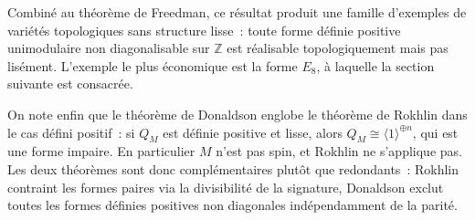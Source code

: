 Combiné au théorème de Freedman, ce résultat produit une famille d'exemples de variétés
topologiques sans structure lisse~: toute forme définie positive unimodulaire non
diagonalisable sur $\mathbb{Z}$ est réalisable topologiquement mais pas lisément. L'exemple
le plus économique est la forme $E_8$, à laquelle la section suivante est consacrée.

\medskip

On note enfin que le théorème de Donaldson englobe le théorème de Rokhlin dans le cas défini
positif~: si $Q_M$ est définie positive et lisse, alors $Q_M \cong \langle 1 \rangle^{\oplus
n}$, qui est une forme impaire. En particulier $M$ n'est pas spin, et Rokhlin ne
s'applique pas. Les deux théorèmes sont donc complémentaires plutôt que redondants~: Rokhlin
contraint les formes paires via la divisibilité de la signature, Donaldson exclut toutes les
formes définies positives non diagonales indépendamment de la parité.